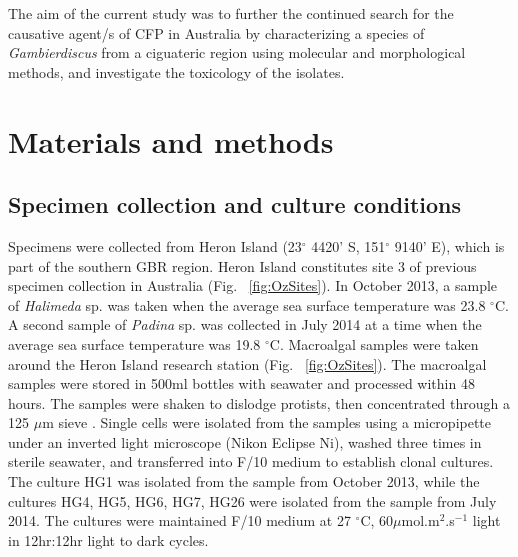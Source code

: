 \documentclass[12pt]{article}
\begin{document}
The aim of the current study was to further the continued search for the causative agent/s of CFP in Australia by characterizing a species of \emph{Gambierdiscus} from a ciguateric region using molecular and morphological methods, and investigate the toxicology of the isolates.

 \newpage
\section{Materials and methods}

\subsection{Specimen collection and culture conditions}
Specimens were collected from Heron Island (23$^{\circ}$ 4420' S, 151$^{\circ}$ 9140' E), which is part of the southern GBR region. 
Heron Island constitutes site 3 of previous specimen collection in Australia (Fig. ~\ref{fig:OzSites}).
In October 2013, a sample of \emph{Halimeda} sp. was taken when the average sea surface temperature was 23.8 $^{\circ}$C. 
A second sample of \emph{Padina} sp. was collected in July 2014 at a time when the average sea surface temperature was 19.8 $^{\circ}$C.
Macroalgal samples were taken around the Heron Island research station (Fig. ~\ref{fig:OzSites}). 
The macroalgal samples were stored in 500ml bottles with seawater and processed within 48 hours. 
The samples were shaken to dislodge protists, then concentrated through a 125 $\mu$m sieve \citep{litaker2010global}. 
Single cells were isolated from the samples using a micropipette under an inverted light microscope (Nikon Eclipse Ni), washed three times in sterile seawater, and transferred into F/10 medium \citep{holmes1991strain} to establish clonal cultures.
The culture HG1 was isolated from the sample from October 2013, while the cultures HG4, HG5, HG6, HG7, HG26 were isolated from the sample from July 2014.
The cultures were maintained F/10 medium at 27 $^{\circ}$C, 60$\mu$mol.m$^{2}$.s$^{-1}$ light in 12hr:12hr light to dark cycles.


\end{document}
